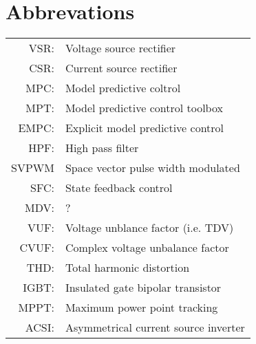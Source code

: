 \chapter*{Abbrevations}
\begin{longtable}{r l}
  VSR:      & Voltage source rectifier \\
  CSR:      & Current source rectifier \\
  MPC:      & Model predictive coltrol\\
  MPT:      & Model predictive control toolbox\\
  EMPC:     & Explicit model predictive control\\
  HPF:      & High pass filter\\
  SVPWM     & Space vector pulse width modulated\\
  SFC:      & State feedback control\\
  MDV:      & ?\\
  VUF:      & Voltage unblance factor (i.e. TDV)\\
	CVUF:			& Complex voltage unbalance factor\\
  THD:      & Total harmonic distortion\\
  IGBT:     & Insulated gate bipolar transistor\\
  MPPT:     & Maximum power point tracking\\
	ACSI:			& Asymmetrical current source inverter\\

\end{longtable} 